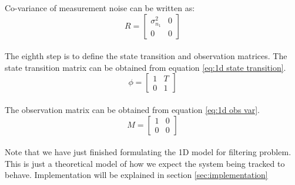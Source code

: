 \documentclass[12pt]{article}
\begin{document}
Co-variance of measurement noise can be written as:
\begin{equation}
R = 
\begin{bmatrix}
	\sigma^2_{n_1} & 0 \\
	0 & 0
\end{bmatrix}
\label{eq:1d mes co-var}
\end{equation}
\\
The eighth step is to define the state transition and observation matrices. The state transition matrix can be obtained from equation \ref{eq:1d state transition}.
\begin{equation}
\phi = 
\begin{bmatrix}
	1 & T \\
	0 & 1
\end{bmatrix}
\label{eq:1d state trans mat}
\end{equation}
\\
The observation matrix can be obtained from equation \ref{eq:1d obs var}.
\begin{equation}
M = 
\begin{bmatrix}
	1 & 0 \\
	0 & 0
\end{bmatrix}
\label{eq:1d state trans mat}
\end{equation}
\\
Note that we have just finished formulating the 1D model for filtering problem. This is just a theoretical model of how we expect the system being tracked to behave. Implementation will be explained in section \ref{sec:implementation}
\end{document}
